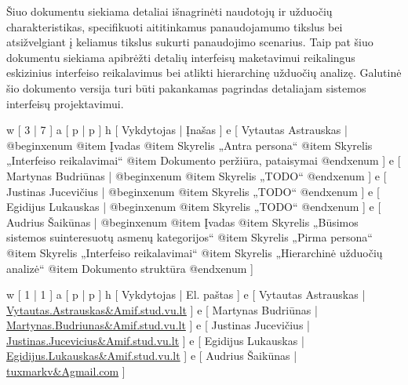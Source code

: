 
Šiuo dokumentu siekiama detaliai išnagrinėti naudotojų ir
užduočių charakteristikas, specifikuoti aititinkamus panaudojamumo
tikslus bei atsižvelgiant į keliamus tikslus sukurti panaudojimo
scenarius. Taip pat šiuo dokumentu siekiama apibrėžti detalių
interfeisų maketavimui reikalingus eskizinius interfeiso reikalavimus
bei atlikti hierarchinę užduočių analizę. Galutinė šio dokumento
versija turi būti pakankamas pagrindas detaliajam sistemos interfeisų
projektavimui.

\xtable
{
  w [ 3  | 7 ]
  a [ p  | p ]
  h [ Vykdytojas | Įnašas ]
  e [ Vytautas Astrauskas
  | @begin{xenum} 
      @item Įvadas
      @item Skyrelis „Antra persona“
      @item Skyrelis „Interfeiso reikalavimai“
      @item Dokumento peržiūra, pataisymai
    @end{xenum}
  ]
  e [ Martynas Budriūnas
  | @begin{xenum} 
      @item Skyrelis „TODO“
    @end{xenum}
  ]
  e [ Justinas Jucevičius 
  | @begin{xenum} 
      @item Skyrelis „TODO“
    @end{xenum}
  ]
  e [ Egidijus Lukauskas 
  | @begin{xenum} 
      @item Skyrelis „TODO“
    @end{xenum}
  ]
  e [ Audrius Šaikūnas 
  | @begin{xenum} 
      @item Įvadas
      @item Skyrelis „Būsimos sistemos suinteresuotų asmenų kategorijos“
      @item Skyrelis „Pirma persona“
      @item Skyrelis „Interfeiso reikalavimai“
      @item Skyrelis „Hierarchinė užduočių analizė“
      @item Dokumento struktūra
    @end{xenum}
  ]
}

\xtablei
{
  w [ 1 | 1 ]
  a [ p | p ]
  h [ Vykdytojas | El. paštas ]
  e [ Vytautas Astrauskas | \url{Vytautas.Astrauskas&Amif.stud.vu.lt} ]
  e [ Martynas Budriūnas  | \url{Martynas.Budriunas&Amif.stud.vu.lt} ]
  e [ Justinas Jucevičius | \url{Justinas.Jucevicius&Amif.stud.vu.lt} ]
  e [ Egidijus Lukauskas  | \url{Egidijus.Lukauskas&Amif.stud.vu.lt} ]
  e [ Audrius Šaikūnas    | \url{tuxmarkv&Agmail.com} ]
}
